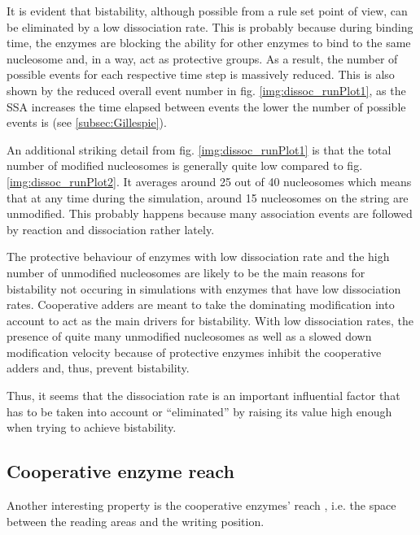             It is evident that bistability, although possible from a rule set point of view, can be eliminated by a low dissociation rate. This is probably because during binding time, the enzymes are blocking the ability for other enzymes to bind to the same nucleosome and, in a way, act as protective groups. As a result, the number of possible events for each respective time step is massively reduced. This is also shown by the reduced overall event number in fig. \ref{img:dissoc_runPlot1}, as the SSA increases the time elapsed between events the lower the number of possible events is (see \ref{subsec:Gillespie}).

            An additional striking detail from fig. \ref{img:dissoc_runPlot1} is that the total number of modified nucleosomes is generally quite low compared to fig. \ref{img:dissoc_runPlot2}. It averages around 25 out of 40 nucleosomes which means that at any time during the simulation, around 15 nucleosomes on the string are unmodified. This probably happens because many association events are followed by reaction and dissociation rather lately.

            The protective behaviour of enzymes with low dissociation rate and the high number of unmodified nucleosomes are likely to be the main reasons for bistability not occuring in simulations with enzymes that have low dissociation rates. Cooperative adders are meant to take the dominating modification into account to act as the main drivers for bistability. With low dissociation rates, the presence of quite many unmodified nucleosomes as well as a slowed down modification velocity because of protective enzymes inhibit the cooperative adders and, thus, prevent bistability.

            Thus, it seems that the dissociation rate is an important influential factor that has to be taken into account or “eliminated” by raising its value high enough when trying to achieve bistability.
        \subsection{Cooperative enzyme reach}
            \label{subsec:cooperativeEnzymeReach}
            Another interesting property is the cooperative enzymes' reach , i.e. the space between the reading areas and the writing position.

